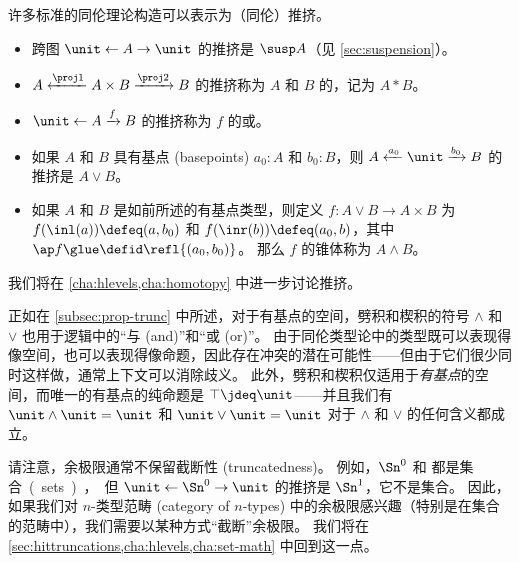 许多标准的同伦理论构造可以表示为（同伦）推挤。
\begin{itemize}
  \item 跨图 $\unit \leftarrow A \to \unit$ 的推挤是  $\susp A$（见 \cref{sec:suspension}）。%
  \item $A \xleftarrow{\proj1} A\times B \xrightarrow{\proj2} B$ 的推挤称为 $A$ 和 $B$ 的，记为 $A*B$。%
  \item $\unit \leftarrow A \xrightarrow{f} B$ 的推挤称为 $f$ 的或。%
  \item 如果 $A$ 和 $B$ 具有基点 (basepoints) $a_0:A$ 和 $b_0:B$，则 $A \xleftarrow{a_0} \unit \xrightarrow{b_0} B$ 的推挤是 $A\vee B$。%
  \item 如果 $A$ 和 $B$ 是如前所述的有基点类型，则定义 $f:A\vee B \to A\times B$ 为 $f(\inl(a))\defeq (a,b_0)$ 和 $f(\inr(b))\defeq (a_0,b)$，其中 $\ap f \glue \defid \refl{(a_0,b_0)}$。
  那么 $f$ 的锥体称为 $A\wedge B$。%
\end{itemize}
我们将在 \cref{cha:hlevels,cha:homotopy} 中进一步讨论推挤。

\begin{rmk}
  正如在 \cref{subsec:prop-trunc} 中所述，对于有基点的空间，劈积和楔积的符号 $\wedge$ 和 $\vee$ 也用于逻辑中的“与 (and)”和“或 (or)”。
  由于同伦类型论中的类型既可以表现得像空间，也可以表现得像命题，因此存在冲突的潜在可能性——但由于它们很少同时这样做，通常上下文可以消除歧义。
  此外，劈积和楔积仅适用于\emph{有基点}的空间，而唯一的有基点的纯命题是 $\top\jdeq\unit$——并且我们有 $\unit\wedge \unit = \unit$ 和 $\unit\vee\unit=\unit$ 对于 $\wedge$ 和 $\vee$ 的任何含义都成立。
\end{rmk}

%

\begin{rmk}
  请注意，余极限通常不保留截断性 (truncatedness)。
  例如，$\Sn^0$ 和 \unit 都是集合 (sets)，但 $\unit \leftarrow \Sn^0 \to \unit$ 的推挤是 $\Sn^1$，它不是集合。
  因此，如果我们对 $n$-类型范畴 (category of $n$-types) 中的余极限感兴趣（特别是在集合的范畴中），我们需要以某种方式“截断”余极限。
  我们将在 \cref{sec:hittruncations,cha:hlevels,cha:set-math} 中回到这一点。
\end{rmk}

